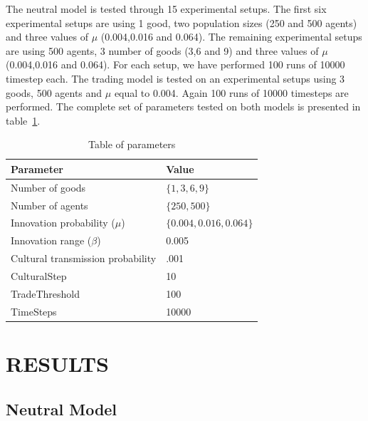 \documentclass{wscpaperproc}
\begin{document}
The neutral model is tested through 15 experimental setups. The first six experimental setups are using 1 good, two population sizes (250 and 500 agents) and three values of $\mu$ (0.004,0.016 and 0.064). The remaining experimental setups are using 500 agents, 3 number of goods (3,6 and 9) and three values of $\mu$ (0.004,0.016 and 0.064). For each setup, we have performed 100 runs of 10000 timestep each. The trading model is tested on an experimental setups using 3 goods, 500 agents and $\mu$ equal to 0.004. Again 100 runs of 10000 timesteps are performed. The complete set of parameters tested on both models is presented in table~\ref{tab:parameters}. 


\begin{table}
\begin{center}
\begin{tabular}{@{}ll@{}}
\toprule
Parameter & Value \\
\midrule
Number of goods & $\{1,3,6,9\}$ \\
Number of agents & $\{250,500\}$ \\
Innovation probability ($\mu$) & $\{0.004,0.016,0.064\}$ \\
Innovation range ($\beta$) & 0.005\\
Cultural transmission probability & .001\\
CulturalStep &  10 \\
TradeThreshold & 100  \\
TimeSteps & 10000 \\
\bottomrule
\end{tabular}
\caption{Table of parameters}\label{tab:parameters}
\end{center}
\end{table}






\section{RESULTS}
\subsection{Neutral Model}
\end{document}

